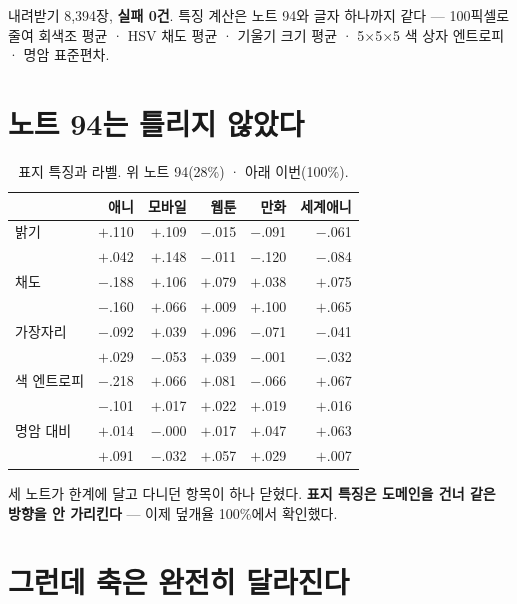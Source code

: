\documentclass[10pt]{article}
\begin{document}
내려받기 8,394장, \textbf{실패 0건}. 특징 계산은 노트 94와 글자 하나까지 같다
--- 100픽셀로 줄여 회색조 평균 · HSV 채도 평균 · 기울기 크기 평균 ·
5$\times$5$\times$5 색 상자 엔트로피 · 명암 표준편차.

\section{노트 94는 틀리지 않았다}

\begin{table}[t]
\centering\tsize
\caption{표지 특징과 라벨. 위 노트 94(28\%) · 아래 이번(100\%).}
\begin{tabular}{lrrrrr}
\toprule
& 애니 & 모바일 & 웹툰 & 만화 & 세계애니 \\
\midrule
밝기 & $+$.110 & $+$.109 & $-$.015 & $-$.091 & $-$.061 \\
 & $+$.042 & $+$.148 & $-$.011 & $-$.120 & $-$.084 \\
채도 & $-$.188 & $+$.106 & $+$.079 & $+$.038 & $+$.075 \\
 & $-$.160 & $+$.066 & $+$.009 & $+$.100 & $+$.065 \\
가장자리 & $-$.092 & $+$.039 & $+$.096 & $-$.071 & $-$.041 \\
 & $+$.029 & $-$.053 & $+$.039 & $-$.001 & $-$.032 \\
색 엔트로피 & $-$.218 & $+$.066 & $+$.081 & $-$.066 & $+$.067 \\
 & $-$.101 & $+$.017 & $+$.022 & $+$.019 & $+$.016 \\
명암 대비 & $+$.014 & $-$.000 & $+$.017 & $+$.047 & $+$.063 \\
 & $+$.091 & $-$.032 & $+$.057 & $+$.029 & $+$.007 \\
\bottomrule
\end{tabular}
\end{table}


세 노트가 한계에 달고 다니던 항목이 하나 닫혔다. \textbf{표지 특징은 도메인을
건너 같은 방향을 안 가리킨다} --- 이제 덮개율 100\%에서 확인했다.

\section{그런데 축은 완전히 달라진다}
\end{document}

